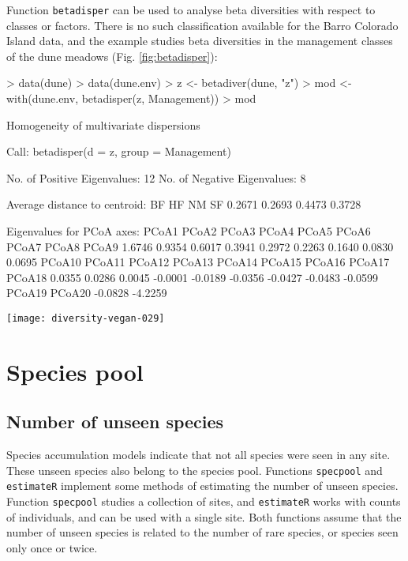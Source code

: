 \documentclass[a4paper,10pt]{amsart}
\begin{document}
Function \texttt{betadisper} can be used to analyse beta diversities
with respect to classes or factors.  There is no such classification
available for the Barro Colorado Island data, and the example studies
beta diversities in the management classes of the dune meadows
(Fig. \ref{fig:betadisper}):
\begin{Schunk}
\begin{Sinput}
> data(dune)
> data(dune.env)
> z <- betadiver(dune, "z")
> mod <- with(dune.env, betadisper(z, Management))
> mod
\end{Sinput}
\begin{Soutput}
	Homogeneity of multivariate dispersions

Call: betadisper(d = z, group = Management)

No. of Positive Eigenvalues: 12
No. of Negative Eigenvalues: 8

Average distance to centroid:
    BF     HF     NM     SF 
0.2671 0.2693 0.4473 0.3728 

Eigenvalues for PCoA axes:
  PCoA1   PCoA2   PCoA3   PCoA4   PCoA5   PCoA6   PCoA7   PCoA8   PCoA9 
 1.6746  0.9354  0.6017  0.3941  0.2972  0.2263  0.1640  0.0830  0.0695 
 PCoA10  PCoA11  PCoA12  PCoA13  PCoA14  PCoA15  PCoA16  PCoA17  PCoA18 
 0.0355  0.0286  0.0045 -0.0001 -0.0189 -0.0356 -0.0427 -0.0483 -0.0599 
 PCoA19  PCoA20 
-0.0828 -4.2259 
\end{Soutput}
\end{Schunk}
\begin{SCfigure}
\texttt{[image: diversity-vegan-029]}
\caption{Box plots of beta diversity measured as the average steepness
  ($z$) of the species area curve in the Arrhenius model $S = cX^z$ in
  Management classes of dune meadows.}
\label{fig:betadisper}
\end{SCfigure}

\section{Species pool}
\subsection{Number of unseen species}

Species accumulation models indicate that not all species were seen in
any site.  These unseen species also belong to the species pool.
Functions \texttt{specpool} and \texttt{estimateR} implement some
methods of estimating the number of unseen species.  Function
\texttt{specpool} studies a collection of sites, and
\texttt{estimateR} works with counts of individuals, and can be used
with a single site.  Both functions assume that the number of unseen
species is related to the number of rare species, or species seen only
once or twice.
\end{document}
